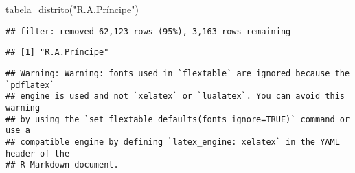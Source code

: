 \documentclass[
]{article}
\newenvironment{Shaded}{\begin{snugshade}}{\end{snugshade}}
\newcommand{\FunctionTok}[1]{\textcolor[rgb]{0.00,0.00,0.00}{#1}}
\newcommand{\NormalTok}[1]{#1}
\newcommand{\StringTok}[1]{\textcolor[rgb]{0.31,0.60,0.02}{#1}}
\begin{document}
\begin{Shaded}
\begin{Highlighting}[]
\FunctionTok{tabela\_distrito}\NormalTok{(}\StringTok{"R.A.Príncipe"}\NormalTok{)}
\end{Highlighting}
\end{Shaded}

\begin{verbatim}
## filter: removed 62,123 rows (95%), 3,163 rows remaining
\end{verbatim}

\begin{verbatim}
## [1] "R.A.Príncipe"
\end{verbatim}

\begin{verbatim}
## Warning: Warning: fonts used in `flextable` are ignored because the `pdflatex`
## engine is used and not `xelatex` or `lualatex`. You can avoid this warning
## by using the `set_flextable_defaults(fonts_ignore=TRUE)` command or use a
## compatible engine by defining `latex_engine: xelatex` in the YAML header of the
## R Markdown document.
\end{verbatim}

\providecommand{\docline}[3]{\noalign{\global\setlength{\arrayrulewidth}{#1}}\arrayrulecolor[HTML]{#2}\cline{#3}}

\setlength{\tabcolsep}{2pt}

\renewcommand*{\arraystretch}{1.5}
\end{document}
